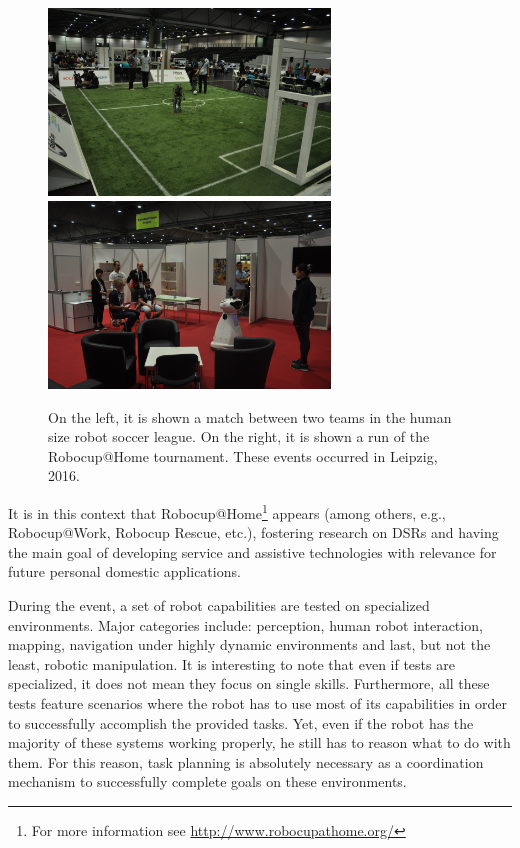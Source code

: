 \begin{figure}[H]
    \centering
        \includegraphics[width=7.5cm]{images/robocup_soccer}
        \includegraphics[width=7.5cm]{images/robocup_athome}
        \caption{On the left, it is shown a match between two teams in the
        human size robot soccer league. On the right, it is shown a run of the
        Robocup@Home tournament. These events occurred in Leipzig, 2016.}
        \label{fig:robocup_imgs}
\end{figure}

It is in this context that Robocup@Home\footnote{For more information see
\url{http://www.robocupathome.org/}} \cite{rulebook_2016} appears (among others,
e.g., Robocup@Work, Robocup Rescue, etc.), fostering research on \glspl{DSR}
and having the main goal of developing service and assistive technologies with
relevance for future personal domestic applications. \par

During the event, a set of robot capabilities are tested on specialized
environments. Major categories include: perception, human robot
interaction, mapping, navigation under highly dynamic environments and last, but
not the least, robotic manipulation. It is interesting to note that even if
tests are specialized, it does not mean they focus on single skills.
Furthermore, all these tests feature scenarios where the robot has to
use most of its capabilities in order to successfully accomplish the provided
tasks. Yet, even if the robot has the majority of these systems working
properly, he still has to reason what to do with them. For this reason, task
planning is absolutely necessary as a coordination mechanism to successfully
complete goals on these environments. \par

